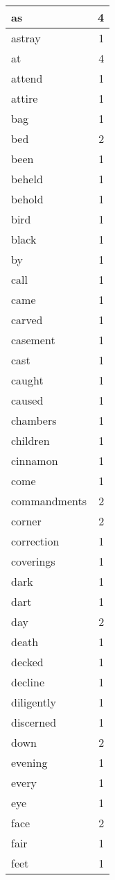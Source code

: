 \begin{center}
\begin{longtable}{l|r}
as & 4\\ \hline 
astray & 1\\ \hline 
at & 4\\ \hline 
attend & 1\\ \hline 
attire & 1\\ \hline 
bag & 1\\ \hline 
bed & 2\\ \hline 
been & 1\\ \hline 
beheld & 1\\ \hline 
behold & 1\\ \hline 
bird & 1\\ \hline 
black & 1\\ \hline 
by & 1\\ \hline 
call & 1\\ \hline 
came & 1\\ \hline 
carved & 1\\ \hline 
casement & 1\\ \hline 
cast & 1\\ \hline 
caught & 1\\ \hline 
caused & 1\\ \hline 
chambers & 1\\ \hline 
children & 1\\ \hline 
cinnamon & 1\\ \hline 
come & 1\\ \hline 
commandments & 2\\ \hline 
corner & 2\\ \hline 
correction & 1\\ \hline 
coverings & 1\\ \hline 
dark & 1\\ \hline 
dart & 1\\ \hline 
day & 2\\ \hline 
death & 1\\ \hline 
decked & 1\\ \hline 
decline & 1\\ \hline 
diligently & 1\\ \hline 
discerned & 1\\ \hline 
down & 2\\ \hline 
evening & 1\\ \hline 
every & 1\\ \hline 
eye & 1\\ \hline 
face & 2\\ \hline 
fair & 1\\ \hline 
feet & 1\\ \hline 

\end{longtable}
\end{center}
